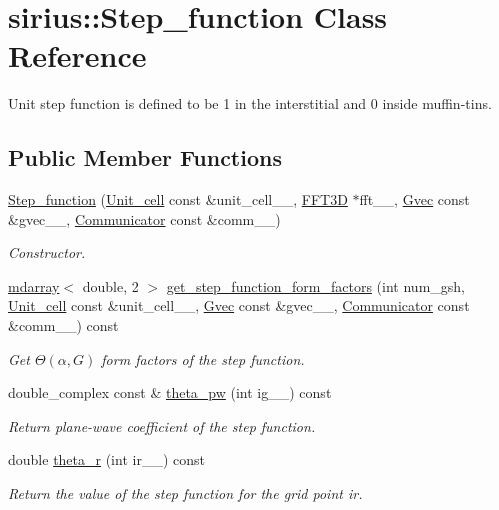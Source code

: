 \hypertarget{classsirius_1_1_step__function}{}\section{sirius\+:\+:Step\+\_\+function Class Reference}
\label{classsirius_1_1_step__function}


Unit step function is defined to be 1 in the interstitial and 0 inside muffin-\/tins.  


\subsection*{Public Member Functions}
\begin{DoxyCompactItemize}
\item 
\hyperlink{classsirius_1_1_step__function_a2e2c0019b924cbe20a26323c550c498a}{Step\+\_\+function} (\hyperlink{classsirius_1_1_unit__cell}{Unit\+\_\+cell} const \&unit\+\_\+cell\+\_\+\+\_\+, \hyperlink{classsddk_1_1_f_f_t3_d}{F\+F\+T3\+D} $\ast$fft\+\_\+\+\_\+, \hyperlink{classsddk_1_1_gvec}{Gvec} const \&gvec\+\_\+\+\_\+, \hyperlink{classsddk_1_1_communicator}{Communicator} const \&comm\+\_\+\+\_\+)
\begin{DoxyCompactList}\small\item\em Constructor. \end{DoxyCompactList}\item 
\hyperlink{classsddk_1_1mdarray}{mdarray}$<$ double, 2 $>$ \hyperlink{classsirius_1_1_step__function_a60c320f1c66e3033c41f53c25a425c30}{get\+\_\+step\+\_\+function\+\_\+form\+\_\+factors} (int num\+\_\+gsh, \hyperlink{classsirius_1_1_unit__cell}{Unit\+\_\+cell} const \&unit\+\_\+cell\+\_\+\+\_\+, \hyperlink{classsddk_1_1_gvec}{Gvec} const \&gvec\+\_\+\+\_\+, \hyperlink{classsddk_1_1_communicator}{Communicator} const \&comm\+\_\+\+\_\+) const 
\begin{DoxyCompactList}\small\item\em Get $ \Theta(\alpha, G) $ form factors of the step function. \end{DoxyCompactList}\item 
double\+\_\+complex const \& \hyperlink{classsirius_1_1_step__function_a381c98cb82cc4ce2134e936655779727}{theta\+\_\+pw} (int ig\+\_\+\+\_\+) const 
\begin{DoxyCompactList}\small\item\em Return plane-\/wave coefficient of the step function. \end{DoxyCompactList}\item 
double \hyperlink{classsirius_1_1_step__function_a1311008d699b84e87cc76aa17f8c2245}{theta\+\_\+r} (int ir\+\_\+\+\_\+) const 
\begin{DoxyCompactList}\small\item\em Return the value of the step function for the grid point ir. \end{DoxyCompactList}\end{DoxyCompactItemize}

